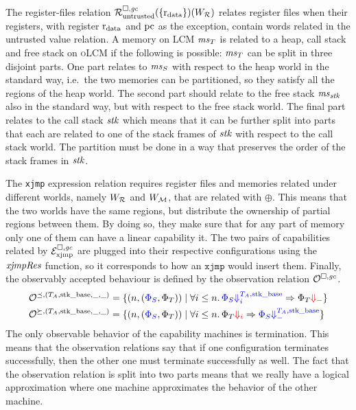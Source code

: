 \documentclass[acmsmall,review,anonymous]{acmart}\settopmatter{printfolios=true,printccs=false,printacmref=false}
\newcommand{\xjmpres}[1]{\plainfun{xjmpRes}{#1}}
\newcommand{\trgcm}{\textsc{LCM}}
\newcommand{\srccm}{\textsc{oLCM}}
\newcommand{\extend}[1]{}
\begin{document}
The register-files relation $\lrr(\{\rdata\}) (W_\lrrs )$ relates register files when their registers, with register $\rdata$ and $\pcreg$ as the exception, contain words related in the untrusted value relation.
A memory on \trgcm{} $\ms_T$ is related to a heap, call stack and free stack on \srccm{} if the following is possible: $\ms_T$ can be split in three disjoint parts.
One part relates to $\ms_S$ with respect to the heap world in the standard way, i.e.\ the two memories can be partitioned, so they satisfy all the regions of the heap world.
The second part should relate to the free stack $\ms_\stk$ also in the standard way, but with respect to the free stack world.
The final part relates to the call stack $\stk$ which means that it can be further split into parts that each are related to one of the stack frames of $\stk$ with respect to the call stack world.
The partition must be done in a way that preserves the order of the stack frames in $\stk$.
\extend{Write about the particulars of the three memory satisfaction: heap relation makes sure only one interpretation for each seal. Free stack $\stkb$}
The \texttt{xjmp} expression relation requires register files and memories related under different worlds, namely $W_\lrrs$ and $W_\lrm$, that are related with $\oplus$.
This means that the two worlds have the same regions, but distribute the ownership of partial regions between them.
By doing so, they make sure that for any part of memory only one of them can have a linear capability it.
The two pairs of capabilities related by $\lrexj$ are plugged into their respective configurations using the $\xjmpres{}$ function, so it corresponds to how an $\texttt{xjmp}$ would insert them.
Finally, the observably accepted behaviour is defined by the observation relation $\lro$.
\begin{align*}
  \lro[\preceq,(\ta,\stkb,\_,\_)] ={}&\{ \npair{\left(\src{\Phi_S},\Phi_T\right)} \mid
  \forall i \leq n \ldotp
    \src{\Phi_S \sterm[i]{\ta,\stkb}} \Rightarrow \Phi_T \trg{\term} \}\\
  \lro[\succeq,(\ta,\stkb,\_,\_)] ={}& \{ \npair{\left(\src{\Phi_S},\Phi_T\right)} \mid
  \forall i \leq n \ldotp 
    \Phi_T \trg{\term[i]} \Rightarrow \src{\Phi_S \sterm{\ta,\stkb}} \}
\end{align*}
The only observable behavior of the capability machines is termination. 
This means that the observation relations say that if one configuration terminates successfully, then the other one must terminate successfully as well.
The fact that the observation relation is split into two parts means that we really have a logical approximation where one machine approximates the behavior of the other machine.
\end{document}
